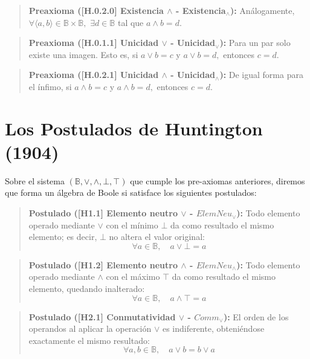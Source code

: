 \begin{quote}\textbf{Preaxioma ([H.0.2.0] Existencia $\wedge$ - Existencia$_\wedge$):}\label{exist_wedge}
Análogamente, $\forall \langle a,b \rangle \in \mathbb{B} \times \mathbb{B},$ $\exists d \in \mathbb{B}$ tal que $a \wedge b = d.$
\end{quote}

\begin{quote}\textbf{Preaxioma ([H.0.1.1] Unicidad $\vee$ - Unicidad$_\vee$):}\label{unic_vee}
Para un par solo existe una imagen. Esto es, si $a \vee b = c$ y $a \vee b = d,$ entonces $c = d.$
\end{quote}

\begin{quote}\textbf{Preaxioma ([H.0.2.1] Unicidad $\wedge$ - Unicidad$_\wedge$):}\label{unic_wedge}
De igual forma para el ínfimo, si $a \wedge b = c$ y $a \wedge b = d,$ entonces $c = d.$
\end{quote}

\section{Los Postulados de Huntington (1904)}
Sobre el sistema $(\mathbb{B}, \vee, \wedge, \bot, \top)$ que cumple los pre-axiomas anteriores, diremos que forma un álgebra de Boole si satisface los siguientes postulados:

\begin{quote}\textbf{Postulado ([H1.1] Elemento neutro $\vee$ - $ElemNeu_\vee$):}\label{neutro_vee}
Todo elemento operado mediante $\vee$ con el mínimo $\bot$ da como resultado el mismo elemento; es decir, $\bot$ no altera el valor original:
\[ \forall a \in \mathbb{B}, \quad a \vee \bot = a \]
\end{quote}

\begin{quote}\textbf{Postulado ([H1.2] Elemento neutro $\wedge$ - $ElemNeu_\wedge$):}\label{neutro_wedge}
Todo elemento operado mediante $\wedge$ con el máximo $\top$ da como resultado el mismo elemento, quedando inalterado:
\[ \forall a \in \mathbb{B}, \quad a \wedge \top = a \]
\end{quote}

\begin{quote}\textbf{Postulado ([H2.1] Conmutatividad $\vee$ - $Comm_\vee$):}\label{conmut_vee}
El orden de los operandos al aplicar la operación $\vee$ es indiferente, obteniéndose exactamente el mismo resultado:
\[ \forall a, b \in \mathbb{B}, \quad a \vee b = b \vee a \]
\end{quote}


